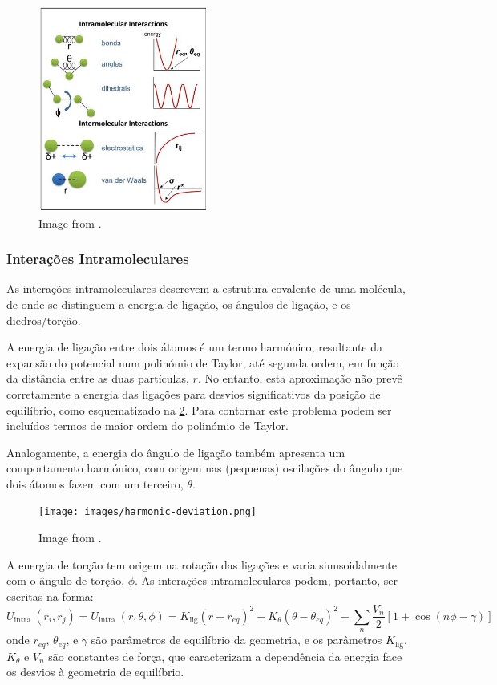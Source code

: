 \documentclass[12pt,a4paper]{article}
\begin{document}
	\begin{figure}[h]
		\centering
		\includegraphics[width=0.5\textwidth]{images/interactions.jpeg}
		\caption{Image from \cite{cheathamMolecularModelingNucleic2001}.}
		\label{fig:intro:inters}
	\end{figure}

\subsubsection{Interações Intramoleculares}
	As interações intramoleculares descrevem a estrutura covalente de uma molécula, de onde se distinguem a energia de ligação, os ângulos de ligação, e os diedros/torção.
	
	A energia de ligação entre dois átomos é um termo harmónico, resultante da expansão do potencial num polinómio de Taylor, até segunda ordem, em função da distância entre as duas partículas, $r$. No entanto, esta aproximação não prevê corretamente a energia das ligações  para desvios significativos da posição de equilíbrio, como esquematizado na \cref{fig:intro:harmonic-deviation}. Para contornar este problema podem ser incluídos termos de maior ordem do polinómio de Taylor.
	
	Analogamente, a energia do ângulo de ligação também apresenta um comportamento harmónico, com origem nas (pequenas) oscilações do ângulo que dois átomos fazem com um terceiro, $\theta$.

	\begin{figure}[h]
		\centering
		\texttt{[image: images/harmonic-deviation.png]}
		\caption{Image from \cite{2021Harmonic}.}
		\label{fig:intro:harmonic-deviation}
	\end{figure}
	 
	 A energia de torção tem origem na rotação das ligações e varia sinusoidalmente com o ângulo de torção, $\phi$. As interações intramoleculares podem, portanto, ser escritas na forma:
	\begin{equation}
		U_{\text {intra }}\left(r_i,r_j\right)=U_{\text {intra }}\left(r,\theta,\phi\right)= K_{\textrm{lig}}\left(r-r_{e q}\right)^{2}+ K_{\theta}\left(\theta-\theta_{e q}\right)^{2}+ \sum_{n} \frac{V_{n}}{2}[1+\cos (n \phi-\gamma)]
	\end{equation}
	onde $r_{eq}$, $\theta_{eq}$, e $\gamma$ são parâmetros de equilíbrio da geometria, e os parâmetros $K_\textrm{lig}$, $K_\theta$ e $V_n$ são constantes de força, que caracterizam a dependência da energia face os desvios à geometria de equilíbrio. 
	
\end{document}
